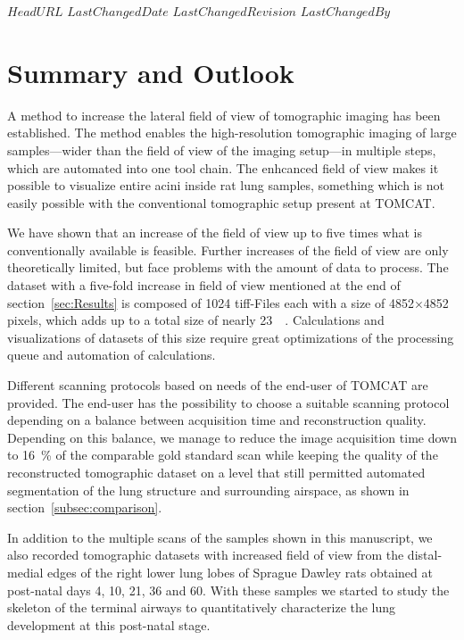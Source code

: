 \svnidlong
{$HeadURL$}
{$LastChangedDate$}
{$LastChangedRevision$}
{$LastChangedBy$}
%
%
\section{Summary and Outlook}\label{summary and outlook}%

A method to increase the lateral field of view of tomographic imaging has been established. The method enables the high-resolution tomographic imaging of large samples---wider than the field of view of the imaging setup---in multiple steps, which are automated into one tool chain. The enhcanced field of view makes it possible to visualize entire acini inside rat lung samples, something which is not easily possible with the conventional tomographic setup present at TOMCAT.

We have shown that an increase of the field of view up to five times what is conventionally available is feasible. Further increases of the field of view are only theoretically limited, but face problems with the amount of data to process. The dataset with a five-fold increase in field of view mentioned at the end of section~\ref{sec:Results} is composed of 1024 tiff-Files each with a size of 4852$\times$4852 pixels, which adds up to a total size of nearly \SI{23}{\giga\byte}. Calculations and visualizations of datasets of this size require great optimizations of the processing queue and automation of calculations.

Different scanning protocols based on needs of the end-user of TOMCAT are provided. The end-user has the possibility to choose a suitable scanning protocol depending on a balance between acquisition time and reconstruction quality. Depending on this balance, we manage to reduce the image acquisition time down to \SI{16}{\percent} of the comparable gold standard scan while keeping the quality of the reconstructed tomographic dataset on a level that still permitted automated segmentation of the lung structure and surrounding airspace, as shown in section~\ref{subsec:comparison}.

In addition to the multiple scans of the samples shown in this manuscript, we also recorded tomographic datasets with increased field of view from the distal-medial edges of the right lower lung lobes of Sprague Dawley rats obtained at post-natal days 4, 10, 21, 36 and 60. With these samples we started to study the skeleton of the terminal airways to quantitatively characterize the lung development at this post-natal stage.
